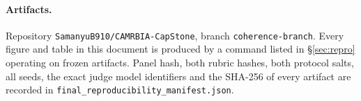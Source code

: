 \documentclass[11pt]{article}
\begin{document}
\paragraph{Artifacts.} Repository \texttt{SamanyuB910/CAMRBIA-CapStone}, branch
\texttt{coherence-branch}. Every figure and table in this document is produced by
a command listed in \S\ref{sec:repro} operating on frozen artifacts. Panel hash,
both rubric hashes, both protocol salts, all seeds, the exact judge model
identifiers and the SHA-256 of every artifact are recorded in
\texttt{final\_reproducibility\_\allowbreak manifest.json}.
\end{document}

